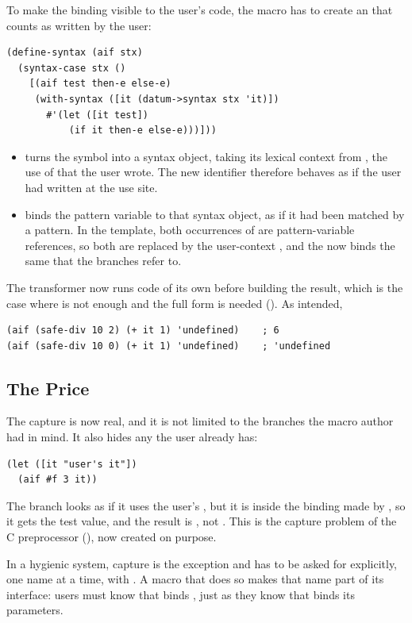 To make the binding visible to the user's code, the macro has to create an  that counts as written by the user:
\begin{lstlisting}
(define-syntax (aif stx)
  (syntax-case stx ()
    [(aif test then-e else-e)
     (with-syntax ([it (datum->syntax stx 'it)])
       #'(let ([it test])
           (if it then-e else-e)))]))
\end{lstlisting}
\begin{itemize}
  \item {} turns the symbol  into a syntax object, taking its lexical context from , the use of  that the user wrote. The new identifier therefore behaves as if the user had written  at the use site.
  \item {} binds the pattern variable  to that syntax object, as if it had been matched by a pattern. In the template, both occurrences of  are pattern-variable references, so both are replaced by the user-context , and the  now binds the same  that the branches refer to.
\end{itemize}
The transformer now runs code of its own before building the result, which is the case where  is not enough and the full  form is needed (). As intended,
\begin{lstlisting}
(aif (safe-div 10 2) (+ it 1) 'undefined)    ; 6
(aif (safe-div 10 0) (+ it 1) 'undefined)    ; 'undefined
\end{lstlisting}

\subsection{The Price}

The capture is now real, and it is not limited to the branches the macro author had in mind. It also hides any  the user already has:
\begin{lstlisting}
(let ([it "user's it"])
  (aif #f 3 it))
\end{lstlisting}
The  branch looks as if it uses the user's , but it is inside the binding made by , so it gets the test value, and the result is , not . This is the capture problem of the C preprocessor (), now created on purpose.

\begin{keypoint}
In a hygienic system, capture is the exception and has to be asked for explicitly, one name at a time, with . A macro that does so makes that name part of its interface: users must know that  binds , just as they know that  binds its parameters.
\end{keypoint}
